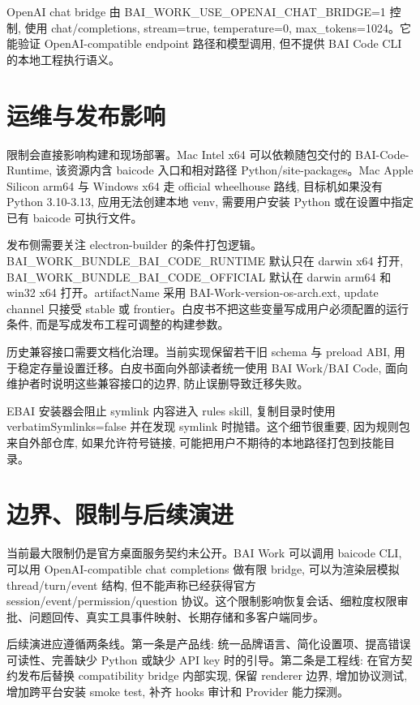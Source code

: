 OpenAI chat bridge 由 BAI\_WORK\_USE\_OPENAI\_CHAT\_BRIDGE=1 控制, 使用 chat/completions, stream=true, temperature=0, max\_tokens=1024。它能验证 OpenAI-compatible endpoint 路径和模型调用, 但不提供 BAI Code CLI 的本地工程执行语义。

\section{运维与发布影响}
限制会直接影响构建和现场部署。Mac Intel x64 可以依赖随包交付的 BAI-Code-Runtime, 该资源内含 baicode 入口和相对路径 Python/site-packages。Mac Apple Silicon arm64 与 Windows x64 走 official wheelhouse 路线, 目标机如果没有 Python 3.10-3.13, 应用无法创建本地 venv, 需要用户安装 Python 或在设置中指定已有 baicode 可执行文件。

发布侧需要关注 electron-builder 的条件打包逻辑。BAI\_WORK\_BUNDLE\_BAI\_CODE\_RUNTIME 默认只在 darwin x64 打开, BAI\_WORK\_BUNDLE\_BAI\_CODE\_OFFICIAL 默认在 darwin arm64 和 win32 x64 打开。artifactName 采用 BAI-Work-{version}-{os}-{arch}.{ext}, update channel 只接受 stable 或 frontier。白皮书不把这些变量写成用户必须配置的运行条件, 而是写成发布工程可调整的构建参数。

历史兼容接口需要文档化治理。当前实现保留若干旧 schema 与 preload ABI, 用于稳定存量设置迁移。白皮书面向外部读者统一使用 BAI Work/BAI Code, 面向维护者时说明这些兼容接口的边界, 防止误删导致迁移失败。

EBAI 安装器会阻止 symlink 内容进入 rules skill, 复制目录时使用 verbatimSymlinks=false 并在发现 symlink 时抛错。这个细节很重要, 因为规则包来自外部仓库, 如果允许符号链接, 可能把用户不期待的本地路径打包到技能目录。

\section{边界、限制与后续演进}
当前最大限制仍是官方桌面服务契约未公开。BAI Work 可以调用 baicode CLI, 可以用 OpenAI-compatible chat completions 做有限 bridge, 可以为渲染层模拟 thread/turn/event 结构, 但不能声称已经获得官方 session/event/permission/question 协议。这个限制影响恢复会话、细粒度权限审批、问题回传、真实工具事件映射、长期存储和多客户端同步。

后续演进应遵循两条线。第一条是产品线: 统一品牌语言、简化设置项、提高错误可读性、完善缺少 Python 或缺少 API key 时的引导。第二条是工程线: 在官方契约发布后替换 compatibility bridge 内部实现, 保留 renderer 边界, 增加协议测试, 增加跨平台安装 smoke test, 补齐 hooks 审计和 Provider 能力探测。

